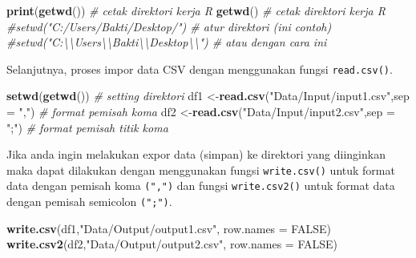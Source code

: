 \documentclass[
]{book}
\newenvironment{Shaded}{\begin{snugshade}}{\end{snugshade}}
\newcommand{\AttributeTok}[1]{\textcolor[rgb]{0.13,0.29,0.53}{#1}}
\newcommand{\CommentTok}[1]{\textcolor[rgb]{0.56,0.35,0.01}{\textit{#1}}}
\newcommand{\ConstantTok}[1]{\textcolor[rgb]{0.56,0.35,0.01}{#1}}
\newcommand{\FunctionTok}[1]{\textcolor[rgb]{0.13,0.29,0.53}{\textbf{#1}}}
\newcommand{\NormalTok}[1]{#1}
\newcommand{\OtherTok}[1]{\textcolor[rgb]{0.56,0.35,0.01}{#1}}
\newcommand{\StringTok}[1]{\textcolor[rgb]{0.31,0.60,0.02}{#1}}
\begin{document}
\begin{Shaded}
\begin{Highlighting}[]
\FunctionTok{print}\NormalTok{(}\FunctionTok{getwd}\NormalTok{())                                   }\CommentTok{\# cetak direktori kerja R}
\FunctionTok{getwd}\NormalTok{()                                          }\CommentTok{\# cetak direktori kerja R}
\CommentTok{\#setwd("C:/Users/Bakti/Desktop/")                \# atur direktori (ini contoh)}
\CommentTok{\#setwd("C:\textbackslash{}\textbackslash{}Users\textbackslash{}\textbackslash{}Bakti\textbackslash{}\textbackslash{}Desktop\textbackslash{}\textbackslash{}")            \# atau dengan cara ini}
\end{Highlighting}
\end{Shaded}

Selanjutnya, proses impor data CSV dengan menggunakan fungsi \texttt{read.csv()}.

\begin{Shaded}
\begin{Highlighting}[]
\FunctionTok{setwd}\NormalTok{(}\FunctionTok{getwd}\NormalTok{())                                    }\CommentTok{\# setting direktori}
\NormalTok{df1 }\OtherTok{\textless{}{-}}\FunctionTok{read.csv}\NormalTok{(}\StringTok{"Data/Input/input1.csv"}\NormalTok{,}\AttributeTok{sep =} \StringTok{","}\NormalTok{) }\CommentTok{\# format pemisah koma }
\NormalTok{df2 }\OtherTok{\textless{}{-}}\FunctionTok{read.csv}\NormalTok{(}\StringTok{"Data/Input/input2.csv"}\NormalTok{,}\AttributeTok{sep =} \StringTok{";"}\NormalTok{) }\CommentTok{\# format pemisah titik koma}
\end{Highlighting}
\end{Shaded}

Jika anda ingin melakukan expor data (simpan) ke direktori yang diinginkan maka dapat dilakukan dengan menggunakan fungsi \texttt{write.csv()} untuk format data dengan pemisah koma \texttt{(",")} dan fungsi \texttt{write.csv2()} untuk format data dengan pemisah semicolon \texttt{(";")}.

\begin{Shaded}
\begin{Highlighting}[]
\FunctionTok{write.csv}\NormalTok{(df1,}\StringTok{"Data/Output/output1.csv"}\NormalTok{, }\AttributeTok{row.names =} \ConstantTok{FALSE}\NormalTok{)  }
\FunctionTok{write.csv2}\NormalTok{(df2,}\StringTok{"Data/Output/output2.csv"}\NormalTok{, }\AttributeTok{row.names =} \ConstantTok{FALSE}\NormalTok{)    }
\end{Highlighting}
\end{Shaded}
\end{document}
